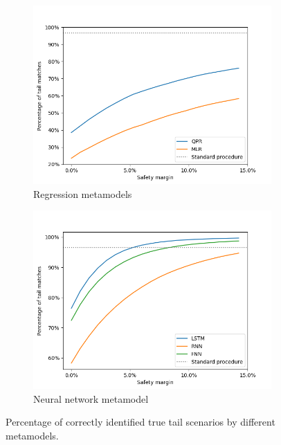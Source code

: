\documentclass{article}
\begin{document}
\begin{figure}[ht!]
    \centering
    \begin{subfigure}{0.48\textwidth}
        \includegraphics[width=\textwidth]{./figures/tailMatches/regLN.png}
        \caption{Regression metamodels}
    \end{subfigure}\hfill
    \begin{subfigure}{0.48\textwidth}
        \includegraphics[width=\textwidth]{./figures/tailMatches/nnLN.png}
        \caption{Neural network metamodel}
    \end{subfigure}
    \caption{Percentage of correctly identified true tail scenarios by different metamodels.}
    \label{fig:tailMatches}
\end{figure}
\end{document}
